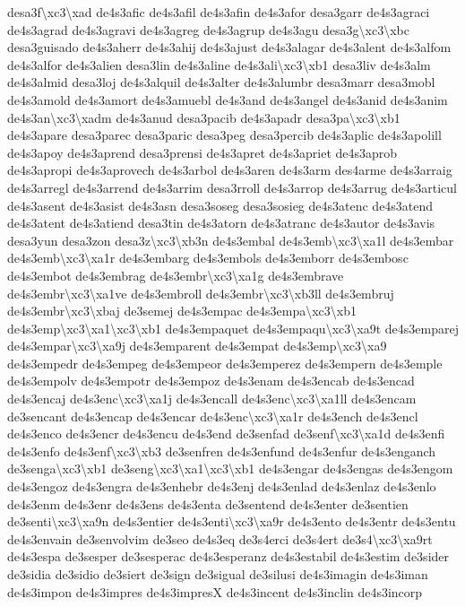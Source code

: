 {desa3f\textbackslash{}xc3\textbackslash{}xad de4s3afic de4s3afil de4s3afin de4s3afor desa3garr de4s3agraci de4s3agrad de4s3agravi de4s3agreg de4s3agrup de4s3agu desa3g\textbackslash{}xc3\textbackslash{}xbc desa3guisado de4s3aherr de4s3ahij de4s3ajust de4s3alagar de4s3alent de4s3alfom de4s3alfor de4s3alien desa3lin de4s3aline de4s3ali\textbackslash{}xc3\textbackslash{}xb1 desa3liv de4s3alm de4s3almid desa3loj de4s3alquil de4s3alter de4s3alumbr desa3marr desa3mobl de4s3amold de4s3amort de4s3amuebl de4s3and de4s3angel de4s3anid de4s3anim de4s3an\textbackslash{}xc3\textbackslash{}xadm de4s3anud desa3pacib de4s3apadr desa3pa\textbackslash{}xc3\textbackslash{}xb1 de4s3apare desa3parec desa3paric desa3peg desa3percib de4s3aplic de4s3apolill de4s3apoy de4s3aprend desa3prensi de4s3apret de4s3apriet de4s3aprob de4s3apropi de4s3aprovech de4s3arbol de4s3aren de4s3arm des4arme de4s3arraig de4s3arregl de4s3arrend de4s3arrim desa3rroll de4s3arrop de4s3arrug de4s3articul de4s3asent de4s3asist de4s3asn desa3soseg desa3sosieg de4s3atenc de4s3atend de4s3atent de4s3atiend desa3tin de4s3atorn de4s3atranc de4s3autor de4s3avis desa3yun desa3zon desa3z\textbackslash{}xc3\textbackslash{}xb3n de4s3embal de4s3emb\textbackslash{}xc3\textbackslash{}xa1l de4s3embar de4s3emb\textbackslash{}xc3\textbackslash{}xa1r de4s3embarg de4s3embols de4s3emborr de4s3embosc de4s3embot de4s3embrag de4s3embr\textbackslash{}xc3\textbackslash{}xa1g de4s3embrave de4s3embr\textbackslash{}xc3\textbackslash{}xa1ve de4s3embroll de4s3embr\textbackslash{}xc3\textbackslash{}xb3ll de4s3embruj de4s3embr\textbackslash{}xc3\textbackslash{}xbaj de3semej de4s3empac de4s3empa\textbackslash{}xc3\textbackslash{}xb1 de4s3emp\textbackslash{}xc3\textbackslash{}xa1\textbackslash{}xc3\textbackslash{}xb1 de4s3empaquet de4s3empaqu\textbackslash{}xc3\textbackslash{}xa9t de4s3emparej de4s3empar\textbackslash{}xc3\textbackslash{}xa9j de4s3emparent de4s3empat de4s3emp\textbackslash{}xc3\textbackslash{}xa9 de4s3empedr de4s3empeg de4s3empeor de4s3emperez de4s3empern de4s3emple de4s3empolv de4s3empotr de4s3empoz de4s3enam de4s3encab de4s3encad de4s3encaj de4s3enc\textbackslash{}xc3\textbackslash{}xa1j de4s3encall de4s3enc\textbackslash{}xc3\textbackslash{}xa1ll de4s3encam de3sencant de4s3encap de4s3encar de4s3enc\textbackslash{}xc3\textbackslash{}xa1r de4s3ench de4s3encl de4s3enco de4s3encr de4s3encu de4s3end de3senfad de3senf\textbackslash{}xc3\textbackslash{}xa1d de4s3enfi de4s3enfo de4s3enf\textbackslash{}xc3\textbackslash{}xb3 de3senfren de4s3enfund de4s3enfur de4s3enganch de3senga\textbackslash{}xc3\textbackslash{}xb1 de3seng\textbackslash{}xc3\textbackslash{}xa1\textbackslash{}xc3\textbackslash{}xb1 de4s3engar de4s3engas de4s3engom de4s3engoz de4s3engra de4s3enhebr de4s3enj de4s3enlad de4s3enlaz de4s3enlo de4s3enm de4s3enr de4s3ens de4s3enta de3sentend de4s3enter de3sentien de3senti\textbackslash{}xc3\textbackslash{}xa9n de4s3entier de4s3enti\textbackslash{}xc3\textbackslash{}xa9r de4s3ento de4s3entr de4s3entu de4s3envain de3senvolvim de3seo de4s3eq de3s4erci de3s4ert de3s4\textbackslash{}xc3\textbackslash{}xa9rt de4s3espa de3sesper de3sesperac de4s3esperanz de4s3estabil de4s3estim de3sider de3sidia de3sidio de3siert de3sign de3sigual de3silusi de4s3imagin de4s3iman de4s3impon de4s3impres de4s3impres\-X de4s3incent de4s3inclin de4s3incorp }
